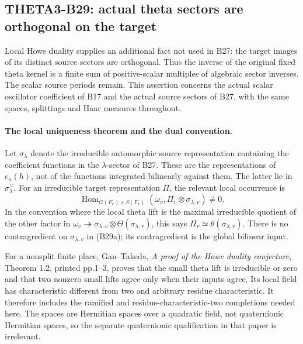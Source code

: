 \documentclass[11pt]{article}
\theoremstyle{definition}\newtheorem{definition}[theorem]{Definition}\newtheorem{remark}[theorem]{Remark}
\begin{document}
\subsection{THETA3-B29: actual theta sectors are orthogonal on the target}\label{B29}

Local Howe duality supplies an additional fact not used in B27:
the target images of its distinct source sectors are orthogonal.
Thus the inverse of the original fixed theta kernel is a finite
sum of positive-scalar multiples of algebraic sector inverses.
The scalar source periods remain.  This assertion concerns the
actual scalar oscillator coefficient of B17 and the actual
source sectors of B27, with the same spaces, splittings and
Haar measures throughout.

\paragraph{The local uniqueness theorem and the dual convention.}
Let $\sigma_\lambda$ denote the irreducible automorphic source
representation containing the coefficient functions in the
$\lambda$-sector of B27.  These are the representations of
$e_a(h)$, not of the functions integrated bilinearly against
them.  The latter lie in $\sigma_\lambda^\vee$.
For an irreducible target representation $\Pi$, the relevant
local occurrence is
\[
 \operatorname{Hom}_{G(F_v)\times S(F_v)}
             (\omega_v,\Pi_v\otimes\sigma_{\lambda,v})\ne0.
 \tag{B29a}
\]
In the convention where the local theta lift is the maximal
irreducible quotient of the other factor in
$\omega_v\twoheadrightarrow\sigma_{\lambda,v}\otimes
\Theta(\sigma_{\lambda,v})$, this says
$\Pi_v\simeq\theta(\sigma_{\lambda,v})$.
There is no contragredient on $\sigma_{\lambda,v}$ in
(B29a); its contragredient is the global bilinear input.

For a nonsplit finite place, Gan--Takeda,
\emph{A proof of the Howe duality conjecture}, Theorem 1.2,
printed pp.1--3, proves that the small theta lift is
irreducible or zero and that two nonzero small lifts agree
only when their inputs agree.  Its local field has
characteristic different from two and arbitrary residue
characteristic.  It therefore includes the ramified and
residue-characteristic-two completions needed here.
The spaces are Hermitian spaces over a quadratic field,
not quaternionic Hermitian spaces, so the separate
quaternionic qualification in that paper is irrelevant.
\end{document}
